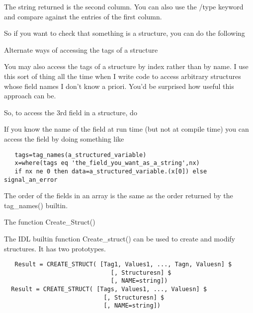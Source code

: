 The string returned is the second column. You can also use the /type
keyword and compare against the entries of the first column.

So if you want to check that something is a structure, you can do the following




  \item Alternate ways of accessing the tags of a structure
    
    You may also access the tags of a structure by index rather than
    by name. I use this sort of thing all the time when I write code
    to access arbitrary structures whose field names I don't know a
    priori. You'd be surprised how useful this approach can be.
    
    So, to access the 3rd field in a structure, do


   
   If you know the name of the field at run time (but not at compile
   time) you can access the field by doing something like 

\begin{IDLExample}\begin{verbatim}   
   tags=tag_names(a_structured_variable)
   x=where(tags eq 'the_field_you_want_as_a_string',nx)
   if nx ne 0 then data=a_structured_variable.(x[0]) else signal_an_error
\end{verbatim}\end{IDLExample}   

    The order of the fields in an array is the same as the order
    returned by the tag\_names() builtin.

  \item The function Create\_Struct()
    
    The IDL builtin function Create\_struct() can be used to create
    and modify structures. It has two prototypes.

\begin{IDLExample}\begin{verbatim}
   Result = CREATE_STRUCT( [Tag1, Values1, ..., Tagn, Valuesn] $
                              [, Structuresn] $
                              [, NAME=string]) 
  Result = CREATE_STRUCT( [Tags, Values1, ..., Valuesn] $
                            [, Structuresn] $
                            [, NAME=string]) 

\end{verbatim}\end{IDLExample}


